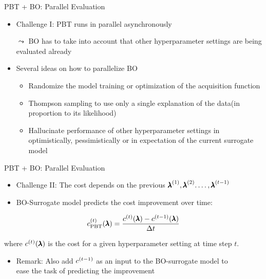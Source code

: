 \begin{frame}[c]{PBT  + BO: Parallel Evaluation}

\begin{itemize}
	\item \alert{Challenge I}: PBT runs in parallel asynchronously
	\pause
	\medskip
	\item[$\leadsto$] BO has to take into account that other hyperparameter settings are being evaluated already
	\pause 
	\medskip
	\item Several ideas on how to parallelize BO
	\begin{itemize}
		\pause
		\smallskip
		\item Randomize the model training or optimization of the acquisition function
		\pause
		\smallskip
		\item Thompson sampling to use only a single explanation of the data\newline (in proportion to its likelihood)
		\pause
		\smallskip
		\item Hallucinate performance of other hyperparameter settings in optimistically, pessimistically or in expectation of the current surrogate model
	\end{itemize}
	
\end{itemize}

\end{frame}
\begin{frame}[c]{PBT  + BO: Parallel Evaluation }

\begin{itemize}
	\item \alert{Challenge II}: The cost depends on the previous ${\pmb{\lambda}}^{(1)}, {\pmb{\lambda}}^{(2)}. \ldots, {\pmb{\lambda}}^{(t-1)}$
	\pause
	\medskip
	\item BO-Surrogate model predicts the cost improvement over time:
\end{itemize}

\begin{equation}
c_{\text{PBT}}^{(t)}(\pmb{\lambda})= \frac{c^{(t)}(\pmb{\lambda}) - c^{(t-1)}(\pmb{\lambda})}{\Delta t}\nonumber
\end{equation}

where $c^{(t)}(\pmb{\lambda})$ is the cost for a given hyperparameter setting at time step $t$.

\bigskip
\pause
\begin{itemize}
	\item Remark: Also add $c^{(t-1)}$ as an input to the BO-surrogate model to\\ ease the task of predicting the improvement
\end{itemize}

\end{frame}

